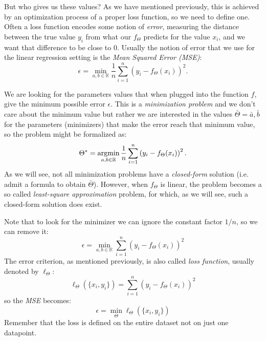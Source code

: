 But who gives us these values? As we have mentioned previously, this is achieved by an optimization process of a proper loss function, so we need to define one.
Often a loss function encodes some notion of \emph{error}, measuring the distance between the true value $y_i$ from what our $f_{\Theta}$ predicts for the value $x_i$, and we want that difference to be close to $0$. Usually the notion of error that we use for the linear regression setting is the \emph{Mean Squared Error (MSE)}:
\begin{equation}
	\epsilon = \min_{a,b \in \mathbb{R}}\frac{1}{n}\sum_{i=1}^{n}\left( y_i - f_{\Theta}(x_i) \right)^2.
\end{equation}

We are looking for the parameters values that when plugged into the function $f$, give the minimum possible error $\epsilon$. This is a \emph{minimization problem} and we don't care about the minimum value but rather we are interested in the values $\bar{\Theta} = \bar{a}, \bar{b}$ for the parameters (minimizers) that make the error reach that minimum value, so the problem might be formalized as:
\begin{equation}
    \Theta^* = \operatorname*{\operatorname{argmin}}_{a, b \in \mathbb{R}}\frac{1}{n}\sum_{i=1}^{n}\left( y_i - f_{\Theta}(x_i) \right)^2.
\end{equation}
As we will see, not all minimization problems have a \emph{closed-form} solution (i.e. admit a formula to obtain $\bar{\Theta}$). However, when $f_{\Theta}$ is linear, the problem becomes a so called \emph{least-square approximation} problem, for which, as we will see, such a closed-form solution does exist.

Note that to look for the minimizer we can ignore the constant factor $1/n$, so we can remove it:
\begin{equation}
	\epsilon = \min_{a,b \in \mathbb{R}}\sum_{i=1}^{n}\left( y_i - f_{\Theta}(x_i) \right)^2
\end{equation}
The error criterion, as mentioned previously, is also called \emph{loss function}, usually denoted by $\ell_\Theta$:
\begin{equation}
	\ell_\Theta \left(\{x_i,y_i\} \right) = \sum_{i=1}^{n}\left( y_i - f_{\Theta}(x_i) \right)^2
\end{equation}
so the \emph{MSE} becomes:
\begin{equation}
	\epsilon = \min_\Theta \ell_\Theta \left( \{x_i, y_i \}\right)
\end{equation}
Remember that the loss is defined on the entire dataset not on just one datapoint.

